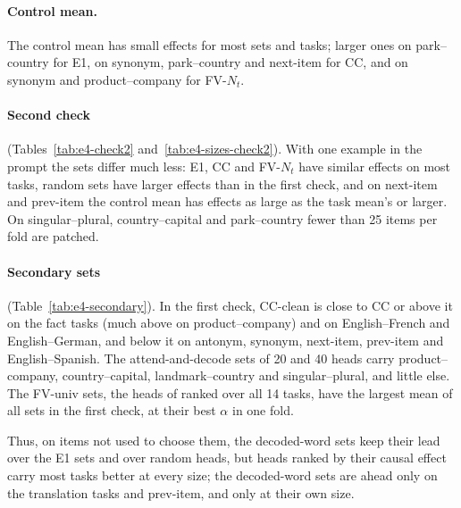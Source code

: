 \documentclass[11pt,a4paper]{article}
\begin{document}
\paragraph{Control mean.} The control mean has small effects for most sets and tasks; larger ones on park--country for E1, on synonym, park--country and next-item for CC, and on synonym and product--company for FV-$N_t$.

\paragraph{Second check} (Tables~\ref{tab:e4-check2} and~\ref{tab:e4-sizes-check2}). With one example in the prompt the sets differ much less: E1, CC and FV-$N_t$ have similar effects on most tasks, random sets have larger effects than in the first check, and on next-item and prev-item the control mean has effects as large as the task mean's or larger. On singular--plural, country--capital and park--country fewer than 25 items per fold are patched.

\paragraph{Secondary sets} (Table~\ref{tab:e4-secondary}). In the first check, CC-clean is close to CC or above it on the fact tasks (much above on product--company) and on English--French and English--German, and below it on antonym, synonym, next-item, prev-item and English--Spanish. The attend-and-decode sets of 20 and 40 heads carry product--company, country--capital, landmark--country and singular--plural, and little else. The FV-univ sets, the heads of \citet{davidson2025different} ranked over all 14 tasks, have the largest mean of all sets in the first check, at their best $\alpha$ in one fold.

Thus, on items not used to choose them, the decoded-word sets keep their lead over the E1 sets and over random heads, but heads ranked by their causal effect carry most tasks better at every size; the decoded-word sets are ahead only on the translation tasks and prev-item, and only at their own size.

\begin{table}[H]
\centering\footnotesize\setlength{\tabcolsep}{3pt}\resizebox{\textwidth}{!}{}
\caption{E4, first check, held-out items: accuracy at the cross-fitted $\alpha$, mean of the two folds, rule-style means of the choosing half averaged over the five templates. Items: patched items in fold~1 / fold~2. E1, CC: the sets chosen on the choosing half. FV-$N_t$: as many heads as the CC set, ranked by the function-vector score. Random-$N_t$: mean of the five draws with the CC set's heads per layer, at the CC set's $\alpha$. FV-30: the 30-head function vector of \citet{davidson2025different} at $\alpha=1$, a reference. ctrl: the control mean at the set's $\alpha$.}
\label{tab:e4-check1}
\end{table}
\end{document}
